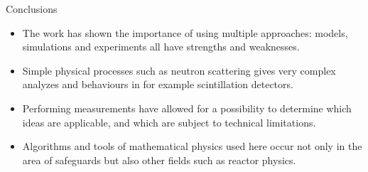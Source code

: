 \documentclass[clock,style=horatio,paper=screen,blackslide,trans=Wipe,mode=present]{powerdot}
\begin{document}
\begin{slide}{Conclusions}
\begin{itemize}
    \item The work has shown the importance of using multiple
        approaches: models, simulations and experiments all
        have strengths and weaknesses. \\[5mm]
    \item Simple physical processes such as neutron scattering
        gives very complex analyzes and behaviours in for
        example scintillation detectors. \\[5mm]
    \item Performing measurements have allowed for a
        possibility to determine which ideas are applicable,
        and which are subject to technical limitations. \\[5mm]
    \item Algorithms and tools of mathematical physics used
        here occur not only in the area of safeguards but also
        other fields such as reactor physics.
\end{itemize}
\end{slide}
\end{document}
